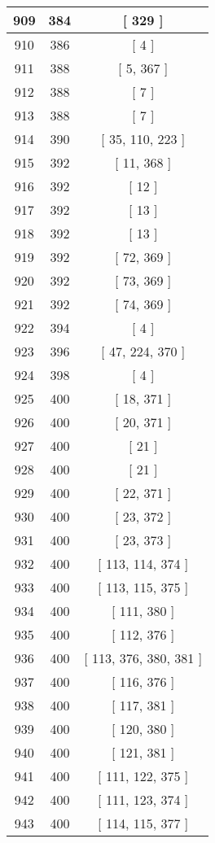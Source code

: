 \begin{center}
\begin{longtable}[H]{|| c c c ||}
\hline
909 & 384 & [ 329 ] \\ 
\hline
910 & 386 & [ 4 ] \\ 
\hline
911 & 388 & [ 5, 367 ] \\ 
\hline
912 & 388 & [ 7 ] \\ 
\hline
913 & 388 & [ 7 ] \\ 
\hline
914 & 390 & [ 35, 110, 223 ] \\ 
\hline
915 & 392 & [ 11, 368 ] \\ 
\hline
916 & 392 & [ 12 ] \\ 
\hline
917 & 392 & [ 13 ] \\ 
\hline
918 & 392 & [ 13 ] \\ 
\hline
919 & 392 & [ 72, 369 ] \\ 
\hline
920 & 392 & [ 73, 369 ] \\ 
\hline
921 & 392 & [ 74, 369 ] \\ 
\hline
922 & 394 & [ 4 ] \\ 
\hline
923 & 396 & [ 47, 224, 370 ] \\ 
\hline
924 & 398 & [ 4 ] \\ 
\hline
925 & 400 & [ 18, 371 ] \\ 
\hline
926 & 400 & [ 20, 371 ] \\ 
\hline
927 & 400 & [ 21 ] \\ 
\hline
928 & 400 & [ 21 ] \\ 
\hline
929 & 400 & [ 22, 371 ] \\ 
\hline
930 & 400 & [ 23, 372 ] \\ 
\hline
931 & 400 & [ 23, 373 ] \\ 
\hline
932 & 400 & [ 113, 114, 374 ] \\ 
\hline
933 & 400 & [ 113, 115, 375 ] \\ 
\hline
934 & 400 & [ 111, 380 ] \\ 
\hline
935 & 400 & [ 112, 376 ] \\ 
\hline
936 & 400 & [ 113, 376, 380, 381 ] \\ 
\hline
937 & 400 & [ 116, 376 ] \\ 
\hline
938 & 400 & [ 117, 381 ] \\ 
\hline
939 & 400 & [ 120, 380 ] \\ 
\hline
940 & 400 & [ 121, 381 ] \\ 
\hline
941 & 400 & [ 111, 122, 375 ] \\ 
\hline
942 & 400 & [ 111, 123, 374 ] \\ 
\hline
943 & 400 & [ 114, 115, 377 ] \\ 

\end{longtable}
\end{center}
